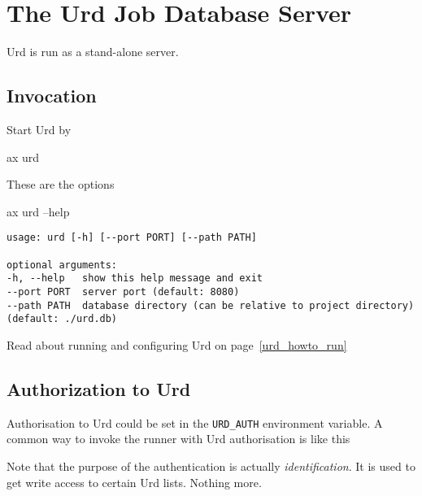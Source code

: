 \section{The Urd Job Database Server}
Urd is run as a stand-alone server.
\subsection{Invocation}
Start Urd by
\begin{shell}
ax urd
\end{shell}
These are the options
\begin{shell}
ax urd --help
\end{shell}
\begin{snugshade}
\begin{verbatim}
usage: urd [-h] [--port PORT] [--path PATH]

optional arguments:
-h, --help   show this help message and exit
--port PORT  server port (default: 8080)
--path PATH  database directory (can be relative to project directory)
(default: ./urd.db)
\end{verbatim}
\end{snugshade}
Read about running and configuring Urd on page~\ref{urd_howto_run}



\subsection{Authorization to Urd}
Authorisation to Urd could be set in the \texttt{URD\_AUTH}
environment variable.  A common way to invoke the runner with Urd
authorisation is like this
\begin{shell}
\end{shell}
Note that the purpose of the authentication is
actually \textsl{identification}.  It is used to get write access to
certain Urd lists.  Nothing more.


